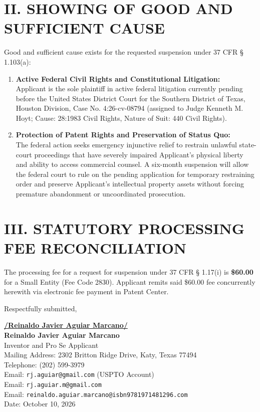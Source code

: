\documentclass[11pt,letterpaper]{article}
\begin{document}
\section*{II. SHOWING OF GOOD AND SUFFICIENT CAUSE}

Good and sufficient cause exists for the requested suspension under 37 CFR \S{} 1.103(a):
\begin{enumerate}[leftmargin=*]
    \item \textbf{Active Federal Civil Rights and Constitutional Litigation:} \\
    Applicant is the sole plaintiff in active federal litigation currently pending before the United States District Court for the Southern District of Texas, Houston Division, Case No. 4:26-cv-08794 (assigned to Judge Kenneth M. Hoyt; Cause: 28:1983 Civil Rights, Nature of Suit: 440 Civil Rights).

    \item \textbf{Protection of Patent Rights and Preservation of Status Quo:} \\
    The federal action seeks emergency injunctive relief to restrain unlawful state-court proceedings that have severely impaired Applicant's physical liberty and ability to access commercial counsel. A six-month suspension will allow the federal court to rule on the pending application for temporary restraining order and preserve Applicant's intellectual property assets without forcing premature abandonment or uncoordinated prosecution.
\end{enumerate}

\section*{III. STATUTORY PROCESSING FEE RECONCILIATION}

The processing fee for a request for suspension under 37 CFR \S{} 1.17(i) is \textbf{\$60.00} for a Small Entity (Fee Code 2830). Applicant remits said \$60.00 fee concurrently herewith via electronic fee payment in Patent Center.

\vspace{0.4cm}
\begin{singlespace}
\noindent Respectfully submitted, \par\vspace{0.8cm}
\underline{\textbf{/Reinaldo Javier Aguiar Marcano/}} \\
\textbf{Reinaldo Javier Aguiar Marcano} \\
Inventor and Pro Se Applicant \\
Mailing Address: 2302 Britton Ridge Drive, Katy, Texas 77494 \\
Telephone: (202) 599-3979 \\
Email: \texttt{rj.aguiar@gmail.com} (USPTO Account) \\
Email: \texttt{rj.aguiar.m@gmail.com} \\
Email: \texttt{reinaldo.aguiar.marcano@isbn9781971481296.com} \\
Date: October 10, 2026
\end{singlespace}
\end{document}
